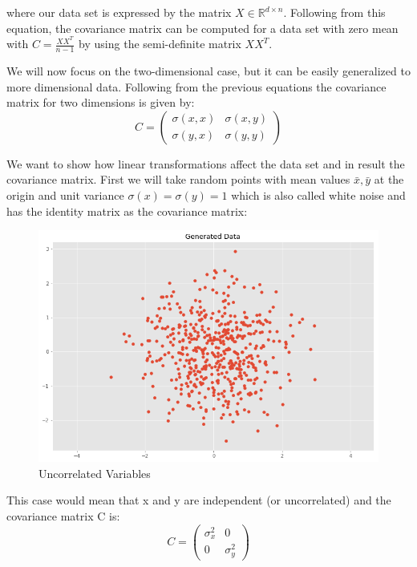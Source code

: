 \documentclass[11pt]{article}
\begin{document}
where our data set is expressed by the matrix $X\in\mathbb{R}^{d\times n}$. Following from this equation, the covariance matrix can be computed for a data set with zero mean with $C = \frac{XX^T}{n-1}$ by using the semi-definite matrix $XX^T$.

We will now focus on the two-dimensional case, but it can be easily generalized to more dimensional data. Following from the previous equations the covariance matrix for two dimensions is given by:
$$C = \left( \begin{array}{ccc}  \sigma(x, x) & \sigma(x, y) \\  \sigma(y, x) & \sigma(y, y) \end{array} \right)$$

We want to show how linear transformations affect the data set and in result the covariance matrix. First we will take random points with mean values $\bar{x},\bar{y}$ at the origin and unit variance $\sigma\left(x\right)=\sigma\left(y\right)=1$ which is also called white noise and has the identity matrix as the covariance matrix:


\begin{figure}[h!]
  \centering
    \includegraphics[scale=0.3]{uncorrelated.png}  
   \caption{Uncorrelated Variables}
\end{figure}


This case would mean that x and y are independent (or uncorrelated) and the covariance matrix C is:
$$C = \left( \begin{array}{ccc}  \sigma_x^2 & 0 \\  0 & \sigma_y^2 \end{array} \right)$$
\end{document}
